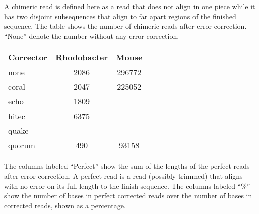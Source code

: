 \documentclass[10pt]{bmc_article}
\newenvironment{bmcformat}{\fussy\setboolean{publ}{true}}{\fussy}
\begin{document}
\begin{bmcformat}
%
%


\label{table:chimeric}

A chimeric read is defined here as a read that does not align in one piece while it has two disjoint subsequences that align to far apart regions of the finished sequence. 
The table shows the number of chimeric reads after error correction. ``None'' denote the number without any error correction.

\bigskip

\begin{tabular}{@{}lS[detect-weight,table-format=4]S[detect-weight,table-format=6]@{}}
\toprule
{Corrector} & {Rhodobacter} & {Mouse}        \\
\midrule
none        & 2086          & 296772         \\
coral       & 2047          & 225052         \\
echo        & 1809          &                \\
hitec       & 6375          &                \\
quake       &   &  \\
quorum      & 490           & 93158          \\
\bottomrule
\end{tabular}

%
%
\label{table:perfect-reads}

The columns labeled ``Perfect'' show the sum of the lengths of the perfect reads after error correction.
A perfect read is a read (possibly trimmed) that aligns with no error on its full length to the finish sequence.
The columns labeled ``\%'' show the number of bases in perfect corrected reads over the number of bases in corrected reads, shown as a percentage.


\bigskip


\end{bmcformat}
\end{document}
